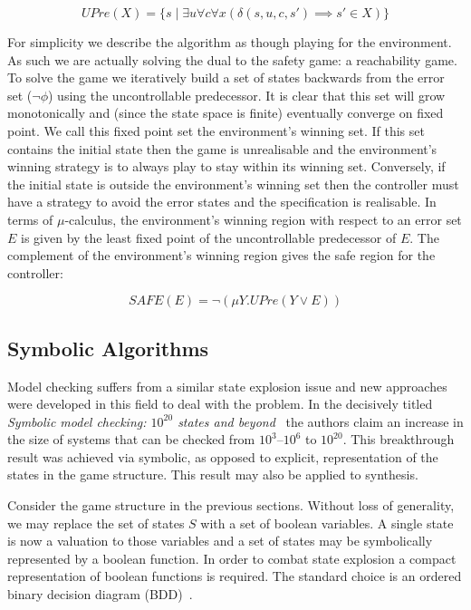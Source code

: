 $$UPre(X) = \{ s \mid \exists u \forall c \forall x (\delta(s, u, c, s') \implies s' \in X) \}$$

For simplicity we describe the algorithm as though playing for the environment. As such we are actually solving the dual to the safety game: a reachability game.  To solve the game we iteratively build a set of states backwards from the error set ($\lnot \phi$) using the uncontrollable predecessor. It is clear that this set will grow monotonically and (since the state space is finite) eventually converge on fixed point. We call this fixed point set the environment's winning set. If this set contains the initial state then the game is unrealisable and the environment's winning strategy is to always play to stay within its winning set. Conversely, if the initial state is outside the environment's winning set then the controller must have a strategy to avoid the error states and the specification is realisable. In terms of $\mu$-calculus, the environment's winning region with respect to an error set $E$ is given by the least fixed point of the uncontrollable predecessor of $E$. The complement of the environment's winning region gives the safe region for the controller:

$$ SAFE(E) = \lnot(\mu Y . UPre( Y \lor E )) $$

\subsection{Symbolic Algorithms}

Model checking suffers from a similar state explosion issue and new approaches were developed in this field to deal with the problem.  In the decisively titled \emph{Symbolic model checking: $10^{20}$ states and beyond}~\cite{Burch90} the authors claim an increase in the size of systems that can be checked from $10^3$--$10^6$ to $10^{20}$. This breakthrough result was achieved via symbolic, as opposed to explicit, representation of the states in the game structure. This result may also be applied to synthesis.

Consider the game structure in the previous sections. Without loss of generality, we may replace the set of states $S$ with a set of boolean variables. A single state is now a valuation to those variables and a set of states may be symbolically represented by a boolean function. In order to combat state explosion a compact representation of boolean functions is required. The standard choice is an ordered binary decision diagram (BDD)~\cite{Bryant86}.

